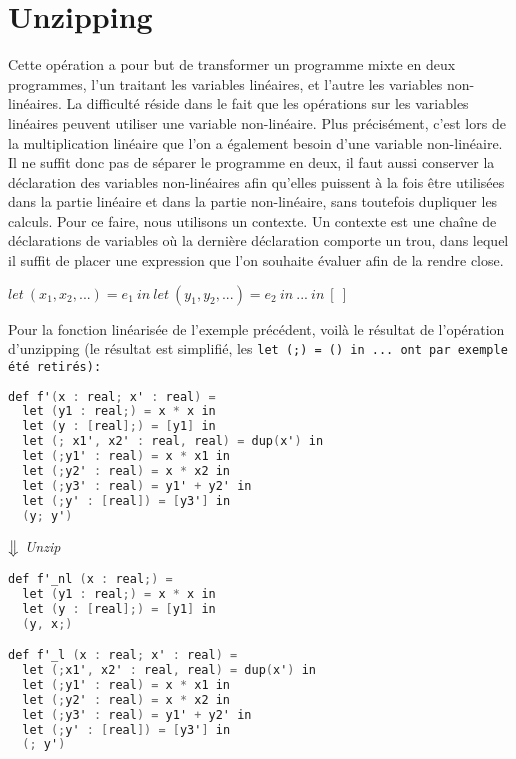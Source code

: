 \documentclass[a4paper, french, 11pt]{article}
\begin{document}
\section{Unzipping}

Cette opération a pour but de transformer un programme mixte en deux programmes, l'un traitant les variables linéaires, et l'autre les variables non-linéaires. La difficulté réside dans le fait que les opérations sur les variables linéaires peuvent utiliser une variable non-linéaire. Plus précisément, c'est lors de la multiplication linéaire que l'on a également besoin d'une variable non-linéaire. Il ne suffit donc pas de séparer le programme en deux, il faut aussi conserver la déclaration des variables non-linéaires afin qu'elles puissent à la fois être utilisées dans la partie linéaire et dans la partie non-linéaire, sans toutefois dupliquer les calculs. Pour ce faire, nous utilisons un contexte. Un contexte est une chaîne de déclarations de variables où la dernière déclaration comporte un trou, dans lequel il suffit de placer une expression que l'on souhaite évaluer afin de la rendre close.

\begin{center}
  $let ~(x_1, x_2, ...) = e_1 ~in ~let ~(y_1, y_2, ...) = e_2~ in~ ...~ in ~[~]$
\end{center}

Pour la fonction linéarisée de l'exemple précédent, voilà le résultat de l'opération d'unzipping (le résultat est simplifié, les \tt let (;) = () in ... \rm ont par exemple été retirés):

\begin{lstlisting}[style=myStyle, language=C]
def f'(x : real; x' : real) =
  let (y1 : real;) = x * x in
  let (y : [real];) = [y1] in
  let (; x1', x2' : real, real) = dup(x') in
  let (;y1' : real) = x * x1 in
  let (;y2' : real) = x * x2 in
  let (;y3' : real) = y1' + y2' in
  let (;y' : [real]) = [y3'] in
  (y; y')
\end{lstlisting}  

\begin{center}
  $\big\Downarrow$ \textit{Unzip}
\end{center}

\begin{lstlisting}[style=myStyle, language=C]
def f'_nl (x : real;) =
  let (y1 : real;) = x * x in
  let (y : [real];) = [y1] in
  (y, x;)

def f'_l (x : real; x' : real) =
  let (;x1', x2' : real, real) = dup(x') in
  let (;y1' : real) = x * x1 in
  let (;y2' : real) = x * x2 in
  let (;y3' : real) = y1' + y2' in
  let (;y' : [real]) = [y3'] in
  (; y')
\end{lstlisting}
\end{document}

